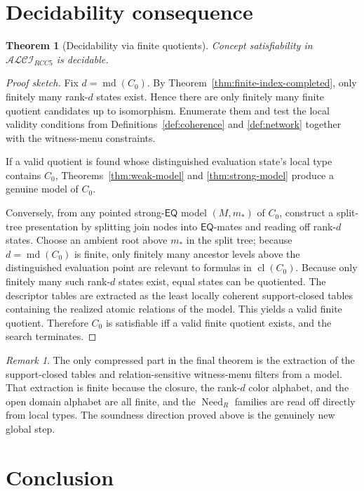 \documentclass[11pt]{article}
\newtheorem{theorem}[definition]{Theorem}
\theoremstyle{remark}
\newtheorem{remark}[definition]{Remark}
\newcommand{\EQ}{\mathsf{EQ}}
\newcommand{\cl}{\operatorname{cl}}
\newcommand{\Need}{\operatorname{Need}}
\newcommand{\md}{\operatorname{md}}
\begin{document}
\section{Decidability consequence}

\begin{theorem}[Decidability via finite quotients]\label{thm:decidability}
Concept satisfiability in $\mathcal{ALCI}_{RCC5}$ is decidable.
\end{theorem}

\begin{proof}[Proof sketch]
Fix $d=\md(C_0)$. By Theorem~\ref{thm:finite-index-completed}, only finitely many rank-$d$ states exist. Hence there are only finitely many finite quotient candidates up to isomorphism. Enumerate them and test the local validity conditions from Definitions~\ref{def:coherence} and \ref{def:network} together with the witness-menu constraints.

If a valid quotient is found whose distinguished evaluation state's local type contains $C_0$, Theorems~\ref{thm:weak-model} and \ref{thm:strong-model} produce a genuine model of $C_0$.

Conversely, from any pointed strong-$\EQ$ model $(M,m_{\ast})$ of $C_0$, construct a split-tree presentation by splitting join nodes into $\EQ$-mates and reading off rank-$d$ states. Choose an ambient root above $m_{\ast}$ in the split tree; because $d=\md(C_0)$ is finite, only finitely many ancestor levels above the distinguished evaluation point are relevant to formulas in $\cl(C_0)$. Because only finitely many such rank-$d$ states exist, equal states can be quotiented. The descriptor tables are extracted as the least locally coherent support-closed tables containing the realized atomic relations of the model. This yields a valid finite quotient. Therefore $C_0$ is satisfiable iff a valid finite quotient exists, and the search terminates.
\end{proof}

\begin{remark}
The only compressed part in the final theorem is the extraction of the support-closed tables and relation-sensitive witness-menu filters from a model. That extraction is finite because the closure, the rank-$d$ color alphabet, and the open domain alphabet are all finite, and the $\Need_R$ families are read off directly from local types. The soundness direction proved above is the genuinely new global step.
\end{remark}

\section{Conclusion}
\end{document}
